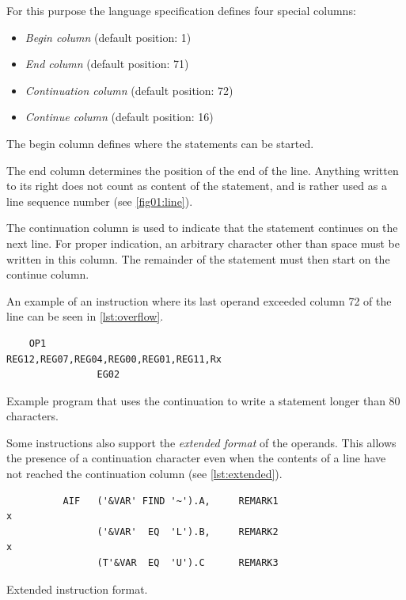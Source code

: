 For this purpose the language specification defines four special columns:
\begin{itemize}
	\item \emph{Begin column} (default position: 1)
	
	\item \emph{End column} (default position: 71)
	
	\item \emph{Continuation column} (default position: 72)
	
	\item \emph{Continue column} (default position: 16)
\end{itemize}

The begin column defines where the statements can be started.

The end column determines the position of the end of the line. Anything written to its right does not count as content of the statement, and is rather used as a line sequence number (see \cref{fig01:line}).

The continuation column is used to indicate that the statement continues on the next line. For proper indication, an arbitrary character other than space must be written in this column. The remainder of the statement must then start on the continue column.

An example of an instruction where its last operand exceeded column 72 of the line can be seen in \cref{lst:overflow}.

\begin{listing}[t]
	\begin{verbatim}
    OP1                            REG12,REG07,REG04,REG00,REG01,REG11,Rx
                EG02
	\end{verbatim}
	\caption{Example program that uses the continuation to write a statement longer than 80 characters.}
	\label{lst:overflow}
\end{listing}

Some instructions also support the \emph{extended format} of the operands. This allows the presence of a continuation character even when the contents of a line have not reached the continuation column (see \cref{lst:extended}).

\begin{listing}[t]
	\begin{verbatim}
          AIF   ('&VAR' FIND '~').A,     REMARK1                        x
                ('&VAR'  EQ  'L').B,     REMARK2                        x
                (T'&VAR  EQ  'U').C      REMARK3 
	\end{verbatim}
	\caption{Extended instruction format.}
	\label{lst:extended}
\end{listing}

